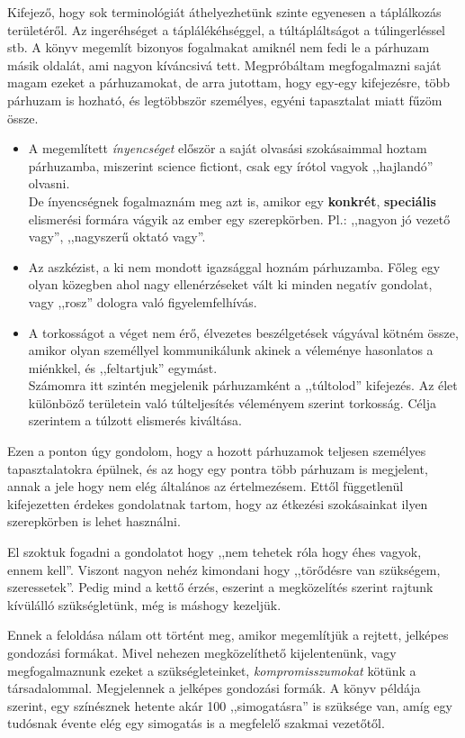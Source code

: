 \documentclass[a4paper,12pt]{article}
\begin{document}
	Kifejező, hogy sok terminológiát áthelyezhetünk szinte egyenesen a táplálkozás területéről. Az ingeréhséget a táplálékéhséggel, a túltápláltságot a túlingerléssel stb. A könyv megemlít bizonyos fogalmakat amiknél nem fedi le a párhuzam másik oldalát, ami nagyon kíváncsivá tett.
	Megpróbáltam  megfogalmazni saját magam ezeket a párhuzamokat, de arra jutottam, hogy egy-egy kifejezésre, több párhuzam is hozható, és legtöbbször személyes, egyéni tapasztalat miatt fűzöm össze. 
	\begin{itemize}
		\item A megemlített \textit{ínyencséget} először a saját olvasási szokásaimmal hoztam párhuzamba, miszerint science fictiont, csak egy írótol vagyok ,,hajlandó'' olvasni. \\
		De ínyencségnek fogalmaznám meg azt is, amikor egy \textbf{konkrét}, \textbf{speciális} elismerési formára vágyik az ember egy szerepkörben. Pl.: ,,nagyon jó vezető vagy'', ,,nagyszerű oktató vagy''.
		\item Az aszkézist, a ki nem mondott igazsággal hoznám párhuzamba. Főleg egy olyan közegben ahol nagy ellenérzéseket vált ki minden negatív gondolat, vagy ,,rosz'' dologra való figyelemfelhívás.
		\item A torkosságot a véget nem érő, élvezetes beszélgetések vágyával kötném össze, amikor olyan személlyel kommunikálunk akinek a véleménye hasonlatos a miénkkel, és ,,feltartjuk'' egymást. \\
		Számomra itt szintén megjelenik párhuzamként a ,,túltolod'' kifejezés. Az élet különböző területein való túlteljesítés véleményem szerint torkosság. Célja szerintem a túlzott elismerés kiváltása.
	\end{itemize}
	Ezen a ponton úgy gondolom, hogy a hozott párhuzamok teljesen személyes tapasztalatokra épülnek, és az hogy egy pontra több párhuzam is megjelent, annak a jele hogy nem elég általános az értelmezésem. Ettől függetlenül kifejezetten érdekes gondolatnak tartom, hogy az étkezési szokásainkat ilyen szerepkörben is lehet használni.
	
	El szoktuk fogadni a gondolatot hogy ,,nem tehetek róla hogy éhes vagyok, ennem kell''. Viszont nagyon nehéz kimondani hogy ,,törődésre van szükségem, szeressetek''. Pedig mind a kettő érzés, eszerint a megközelítés szerint rajtunk kívülálló szükségletünk, még is máshogy kezeljük.
	
	Ennek a feloldása nálam ott történt meg, amikor megemlítjük a rejtett, jelképes gondozási formákat. Mivel nehezen megközelíthető kijelentenünk, vagy megfogalmaznunk ezeket a szükségleteinket, \textit{kompromisszumokat} kötünk a társadalommal. Megjelennek a jelképes gondozási formák. A könyv példája szerint, egy színésznek hetente akár 100 ,,simogatásra'' is szüksége van, amíg egy tudósnak évente elég egy simogatás is a megfelelő szakmai vezetőtől.
	
\end{document}

